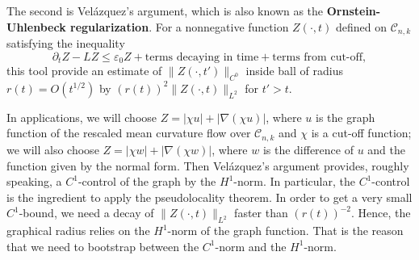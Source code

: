 \documentclass[11pt]{amsart}
\numberwithin{equation}{section}
\numberwithin{equation}{section}
\newcommand{\eps}{\varepsilon}
\newcommand{\cC}{\mathcal{C}}
\newcommand{\pr}{\partial}
\begin{document}
	The second is Vel\'azquez's argument, which is also known as the \textbf{Ornstein-Uhlenbeck regularization}. For a nonnegative function $Z(\cdot,t)$ defined on $\cC_{n,k}$ satisfying the inequality
	\[
	\pr_t Z-LZ\leq \eps_0 Z+\text{terms decaying in time}+\text{terms from cut-off},
	\]
	this tool provide an estimate of $\|Z(\cdot,t')\|_{C^0}$ inside ball of radius $r(t)=O(t^{1/2})$ by $(r(t))^2\|Z(\cdot,t)\|_{L^2}$ for $t'>t$. 
	
	In applications, we will choose $Z=|\chi u|+|\nabla (\chi u)|$, where $u$ is the graph function of the rescaled mean curvature flow over $\cC_{n,k}$ and $\chi$ is a cut-off function; we will also choose $Z=|\chi w|+|\nabla (\chi w)|$, where $w$ is the difference of $u$ and the function given by the normal form. Then Vel\'azquez's argument provides, roughly speaking, a $C^1$-control of the graph by the $H^1$-norm. In particular, the $C^1$-control is the ingredient to apply the pseudolocality theorem. In order to get a very small $C^1$-bound, we need a decay of $\|Z(\cdot,t)\|_{L^2}$ faster than $(r(t))^{-2}$. Hence, the graphical radius relies on the $H^1$-norm of the graph function. That is the reason that we need to bootstrap between the $C^1$-norm and the $H^1$-norm.
	
\end{document}
